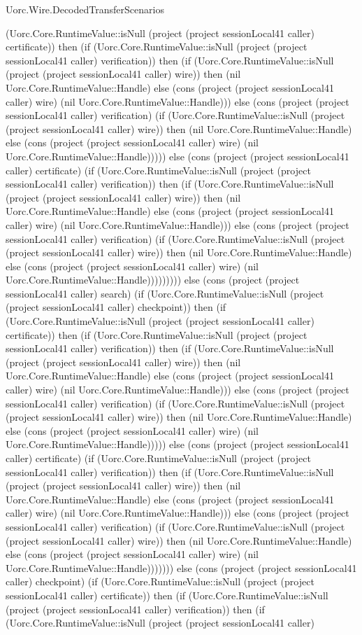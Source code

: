 \begin{lexlean}{Uorc.Wire.DecodedTransferScenarios}
\begin{semanticmodule}
{(Uorc.Core.RuntimeValue::isNull (project (project sessionLocal41 caller) certificate)) then (if (Uorc.Core.RuntimeValue::isNull (project (project sessionLocal41 caller) verification)) then (if (Uorc.Core.RuntimeValue::isNull (project (project sessionLocal41 caller) wire)) then (nil Uorc.Core.RuntimeValue::Handle) else (cons (project (project sessionLocal41 caller) wire) (nil Uorc.Core.RuntimeValue::Handle))) else (cons (project (project sessionLocal41 caller) verification) (if (Uorc.Core.RuntimeValue::isNull (project (project sessionLocal41 caller) wire)) then (nil Uorc.Core.RuntimeValue::Handle) else (cons (project (project sessionLocal41 caller) wire) (nil Uorc.Core.RuntimeValue::Handle))))) else (cons (project (project sessionLocal41 caller) certificate) (if (Uorc.Core.RuntimeValue::isNull (project (project sessionLocal41 caller) verification)) then (if (Uorc.Core.RuntimeValue::isNull (project (project sessionLocal41 caller) wire)) then (nil Uorc.Core.RuntimeValue::Handle) else (cons (project (project sessionLocal41 caller) wire) (nil Uorc.Core.RuntimeValue::Handle))) else (cons (project (project sessionLocal41 caller) verification) (if (Uorc.Core.RuntimeValue::isNull (project (project sessionLocal41 caller) wire)) then (nil Uorc.Core.RuntimeValue::Handle) else (cons (project (project sessionLocal41 caller) wire) (nil Uorc.Core.RuntimeValue::Handle))))))))) else (cons (project (project sessionLocal41 caller) search) (if (Uorc.Core.RuntimeValue::isNull (project (project sessionLocal41 caller) checkpoint)) then (if (Uorc.Core.RuntimeValue::isNull (project (project sessionLocal41 caller) certificate)) then (if (Uorc.Core.RuntimeValue::isNull (project (project sessionLocal41 caller) verification)) then (if (Uorc.Core.RuntimeValue::isNull (project (project sessionLocal41 caller) wire)) then (nil Uorc.Core.RuntimeValue::Handle) else (cons (project (project sessionLocal41 caller) wire) (nil Uorc.Core.RuntimeValue::Handle))) else (cons (project (project sessionLocal41 caller) verification) (if (Uorc.Core.RuntimeValue::isNull (project (project sessionLocal41 caller) wire)) then (nil Uorc.Core.RuntimeValue::Handle) else (cons (project (project sessionLocal41 caller) wire) (nil Uorc.Core.RuntimeValue::Handle))))) else (cons (project (project sessionLocal41 caller) certificate) (if (Uorc.Core.RuntimeValue::isNull (project (project sessionLocal41 caller) verification)) then (if (Uorc.Core.RuntimeValue::isNull (project (project sessionLocal41 caller) wire)) then (nil Uorc.Core.RuntimeValue::Handle) else (cons (project (project sessionLocal41 caller) wire) (nil Uorc.Core.RuntimeValue::Handle))) else (cons (project (project sessionLocal41 caller) verification) (if (Uorc.Core.RuntimeValue::isNull (project (project sessionLocal41 caller) wire)) then (nil Uorc.Core.RuntimeValue::Handle) else (cons (project (project sessionLocal41 caller) wire) (nil Uorc.Core.RuntimeValue::Handle))))))) else (cons (project (project sessionLocal41 caller) checkpoint) (if (Uorc.Core.RuntimeValue::isNull (project (project sessionLocal41 caller) certificate)) then (if (Uorc.Core.RuntimeValue::isNull (project (project sessionLocal41 caller) verification)) then (if (Uorc.Core.RuntimeValue::isNull (project (project sessionLocal41 caller) }
\end{semanticmodule}
\end{lexlean}

